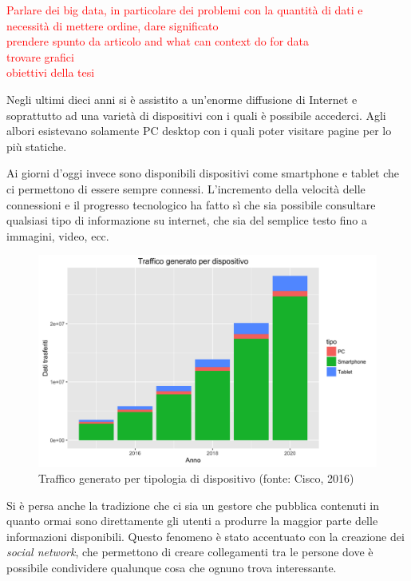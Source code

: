 \textcolor{red}{Parlare dei big data, in particolare dei problemi con la quantità di dati e necessità di mettere ordine, dare significato\\
	prendere spunto da articolo and what can context do for data\\
	trovare grafici\\
	obiettivi della tesi}

Negli ultimi dieci anni si è assistito a un'enorme diffusione di Internet e soprattutto ad una varietà di dispositivi con i quali è possibile accederci. Agli albori esistevano solamente PC desktop con i quali poter visitare pagine per lo più statiche.

Ai giorni d'oggi invece sono disponibili dispositivi come smartphone e tablet che ci permettono di essere sempre connessi. L'incremento della velocità delle connessioni e il progresso tecnologico ha fatto sì che sia possibile consultare qualsiasi tipo di informazione su internet, che sia del semplice testo fino a immagini, video, ecc.

\begin{figure}[ht]
	\centering
	\includegraphics[width=\textwidth]{1-introduzione/Immagini/traffico-dispositivi.png}
	\caption[Traffico generato per tipologia di dispositivo]{Traffico generato per tipologia di dispositivo (fonte: Cisco, 2016)\label{fig:traffico-tipologia-dispositivo}}
\end{figure}

Si è persa anche la tradizione che ci sia un gestore che pubblica contenuti in quanto ormai sono direttamente gli utenti a produrre la maggior parte delle informazioni disponibili. Questo fenomeno è stato accentuato con la creazione dei \emph{social network}, che permettono di creare collegamenti tra le persone dove è possibile condividere qualunque cosa che ognuno trova interessante.

